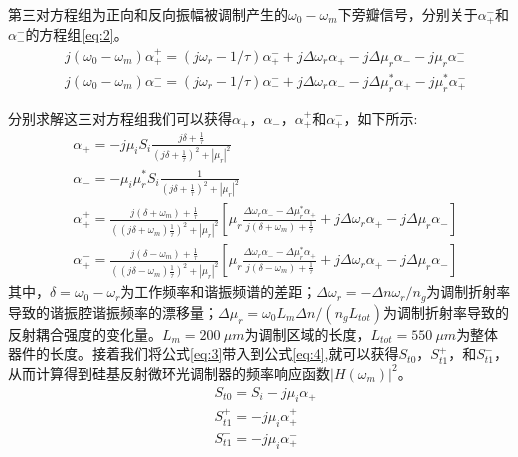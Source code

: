 第三对方程组为正向和反向振幅被调制产生的$\omega_0-\omega_m$下旁瓣信号，分别关于$\alpha_+^-$和$\alpha_-^-$的方程组\ref{eq:2}。
\begin{subequations}  \label{eq:2}
	\begin{align}  
	&j(\omega_0-\omega_m)\alpha_+^+ = (j\omega_r-1/\tau)\alpha_+^- +j\Delta \omega_r\alpha_+ - j\Delta \mu_r\alpha_- - j\mu_r\alpha_-^-            \label{eq:2A} \\
	&j(\omega_0-\omega_m)\alpha_-^- = (j\omega_r-1/\tau)\alpha_-^- +j\Delta \omega_r\alpha_- - j\Delta \mu_r^*\alpha_+ - j\mu_r^*\alpha_+^-           \label{eq:2B}
	\end{align}
\end{subequations}

分别求解这三对方程组我们可以获得$\alpha_+$，$\alpha_-$，$\alpha_+^+$和$\alpha_+^-$，如下所示:
\begin{subequations}  \label{eq:3}
	\begin{align}  
	&\alpha_+ = -j\mu_iS_i \frac{j\delta+\frac{1}{\tau}}{(j\delta+\frac{1}{\tau})^2+|\mu_r|^2}  	\label{eq:3A}\\
	&\alpha_- = -\mu_i\mu_r^*S_i \frac{1}{(j\delta+\frac{1}{\tau})^2+|\mu_r|^2}  	\label{eq:3B}\\	
	&\alpha_+^+ = \frac{j(\delta+\omega_m)+\frac{1}{\tau}}{((j\delta+\omega_m)\frac{1}{\tau})^2+|\mu_r|^2}\left[\mu_r\frac{\Delta \omega_r\alpha_- - \Delta\mu_r^*\alpha_+}{j(\delta+\omega_m)+\frac{1}{\tau}} + j\Delta \omega_r \alpha_+ -j\Delta\mu_r\alpha_-\right]             \label{eq:3C}\\
	&\alpha_+^- = \frac{j(\delta-\omega_m)+\frac{1}{\tau}}{((j\delta-\omega_m)\frac{1}{\tau})^2+|\mu_r|^2}\left[\mu_r\frac{\Delta \omega_r\alpha_- - \Delta\mu_r^*\alpha_+}{j(\delta-\omega_m)+\frac{1}{\tau}} + j\Delta \omega_r \alpha_+ -j\Delta\mu_r\alpha_-\right]             \label{eq:3D}	
	\end{align}
\end{subequations}
其中，$\delta = \omega_0-\omega_r$为工作频率和谐振频谱的差距；$\Delta \omega_r = -\Delta n \omega_r /n_g$为调制折射率导致的谐振腔谐振频率的漂移量；$\Delta \mu_r = \omega_0 L_m \Delta n/(n_g L_{tot})$为调制折射率导致的反射耦合强度的变化量。$L_m = 200~\mu m$为调制区域的长度，$L_{tot} = 550~\mu m$为整体器件的长度。接着我们将公式\ref{eq:3}带入到公式\ref{eq:4},就可以获得$S_{t0}$，$S_{t1}^+$，和$S_{t1}^-$，从而计算得到硅基反射微环光调制器的频率响应函数$|H(\omega_m)|^2$。
\begin{subequations}  \label{eq:4}
	\begin{align}  
	&S_{t0} = S_i-j\mu_i\alpha_+  	\label{eq:4A}\\
	&S_{t1}^+ = -j\mu_i\alpha_+^+ 	\label{eq:4B}\\	
	&S_{t1}^- = -j\mu_i\alpha_+^-            \label{eq:4C}	
	\end{align}
\end{subequations}

